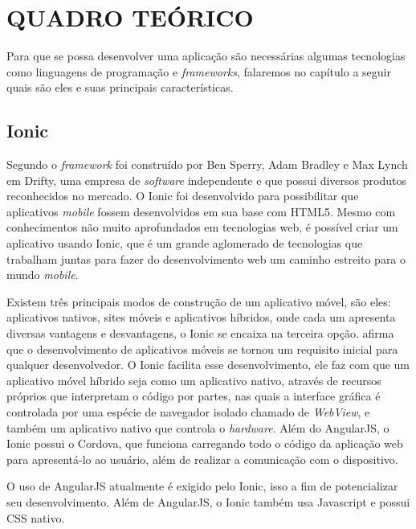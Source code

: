 \chapter{QUADRO TEÓRICO}

	\par Para que se possa desenvolver uma aplicação são necessárias algumas tecnologias como linguagens de programação e \textit{frameworks}, falaremos no capítulo a seguir quais são eles e suas principais características.

\section{Ionic}
	\par Segundo  o \textit{framework} foi construído por Ben Sperry, Adam Bradley e Max Lynch em Drifty, uma empresa de \textit{software} independente e que possui diversos produtos reconhecidos no mercado. O Ionic foi desenvolvido para possibilitar que aplicativos \textit{mobile} fossem desenvolvidos em sua base com HTML5. Mesmo com conhecimentos não muito aprofundados em tecnologias web, é possível criar um aplicativo usando Ionic, que é um grande aglomerado de tecnologias que trabalham juntas para fazer do desenvolvimento web um caminho estreito para o mundo \textit{mobile}.
	
	\par Existem três principais modos de construção de um aplicativo móvel, são eles: aplicativos nativos, sites móveis e aplicativos híbridos, onde cada um apresenta diversas vantagens e desvantagens, o Ionic se encaixa na terceira opção.  afirma que o desenvolvimento de aplicativos móveis se tornou um requisito inicial para qualquer desenvolvedor. O Ionic facilita esse desenvolvimento, ele faz com que um aplicativo móvel híbrido seja como um aplicativo nativo, através de recursos próprios que interpretam o código por partes, nas quais a interface gráfica é controlada por uma espécie de navegador isolado chamado de \textit{WebView}, e também um aplicativo nativo que controla o \textit{hardware}. Além do AngularJS, o Ionic possui o Cordova, que funciona carregando todo o código da aplicação web para apresentá-lo ao usuário, além de realizar a comunicação com o dispositivo.
	
	\par O uso de AngularJS atualmente é exigido pelo Ionic, isso a fim de potencializar seu desenvolvimento. Além de AngularJS, o Ionic também usa Javascript e possui CSS nativo.
	
